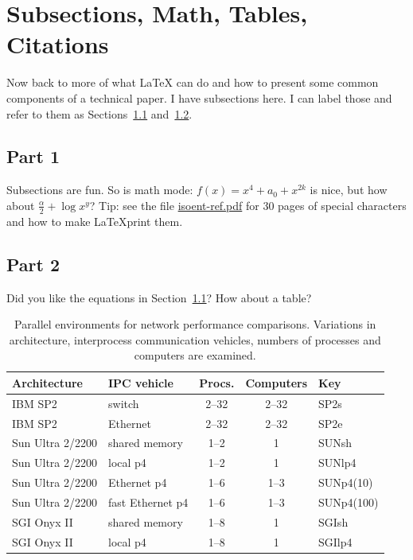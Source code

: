 \documentclass[12pt]{article}
\newcommand{\singlespace}{
  \protect\renewcommand\baselinestretch{1.0}
  \protect\normalsize
}
\begin{document}
\section{Subsections, Math, Tables, Citations}
\label{sec:subsections}

Now back to more of what \LaTeX{} can do and how to present some
common components of a technical paper.  I have subsections here.  I
can label those and refer to them as Sections~\ref{sec:subsection1}
and~\ref{sec:subsection2}.

\subsection{Part 1}
\label{sec:subsection1}

Subsections are fun.  So is math mode: $f(x) = x^4 + a_0 + x^{2k}$ is
nice, but how about $\frac{\alpha}{2} + \log x^y$?  Tip: see the file
\url{isoent-ref.pdf} for 30 pages
of special characters and how to make \LaTeX print them.

\subsection{Part 2}
\label{sec:subsection2}

Did you like the equations in Section~\ref{sec:subsection1}?  How
about a table?

{\singlespace  %
\begin{table}[htb]
\begin{center}
\begin{tabular}{|l|l|c|c|l|}
\hline
{\bf Architecture} & {\bf IPC vehicle} & {\bf Procs.} & {\bf
Computers} & {\bf Key}
\\ \hline \hline
IBM SP2 & switch & 2--32 & 2--32 & SP2s \\ \hline
IBM SP2 & Ethernet & 2--32 & 2--32 & SP2e \\ \hline
Sun Ultra 2/2200 & shared memory & 1--2 & 1 & SUNsh \\ \hline
Sun Ultra 2/2200 & local p4 & 1--2 & 1 & SUNlp4 \\ \hline
Sun Ultra 2/2200 & Ethernet p4 & 1--6 & 1--3 & SUNp4(10) \\ \hline
Sun Ultra 2/2200 & fast Ethernet p4 & 1--6 & 1--3 & SUNp4(100) \\ \hline
SGI Onyx II & shared memory & 1--8 & 1 & SGIsh \\ \hline
SGI Onyx II & local p4 & 1--8 & 1 & SGIlp4 \\ \hline
\end{tabular}
\end{center}
\caption{Parallel environments for network performance
comparisons.  Variations in architecture, interprocess communication
vehicles, numbers of processes and computers are examined.}
\label{tab:machines}
\end{table}
}
\end{document}
